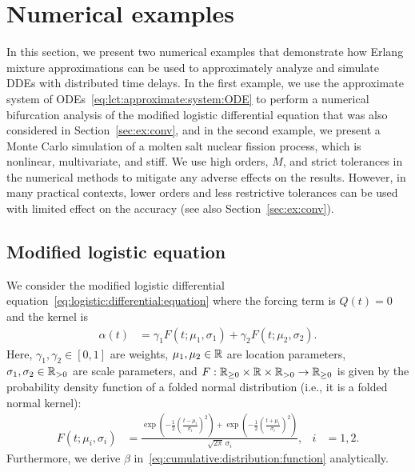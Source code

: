 \section{Numerical examples}\label{sec:ex}
In this section, we present two numerical examples that demonstrate how Erlang mixture approximations can be used to approximately analyze and simulate DDEs with distributed time delays. In the first example, we use the approximate system of ODEs~\eqref{eq:lct:approximate:system:ODE} to perform a numerical bifurcation analysis of the modified logistic differential equation that was also considered in Section~\ref{sec:ex:conv}, and in the second example, we present a Monte Carlo simulation of a molten salt nuclear fission process, which is nonlinear, multivariate, and stiff. We use high orders, $M$, and strict tolerances in the numerical methods to mitigate any adverse effects on the results. However, in many practical contexts, lower orders and less restrictive tolerances can be used with limited effect on the accuracy (see also Section~\ref{sec:ex:conv}).

\subsection{Modified logistic equation}\label{sec:ex:logistic}
We consider the modified logistic differential equation~\eqref{eq:logistic:differential:equation} where the forcing term is $Q(t) = 0$ and the kernel is
%
\begin{align}\label{eq:logistic:equation:kernel}
	\alpha(t) &= \gamma_1 F(t; \mu_1, \sigma_1) + \gamma_2 F(t; \mu_2, \sigma_2).
\end{align}
%
Here, $\gamma_1, \gamma_2 \in [0, 1]$ are weights, $\mu_1, \mu_2 \in \mathbb{R}$ are location parameters, $\sigma_1, \sigma_2 \in \mathbb{R}_{> 0}$ are scale parameters, and $F: \mathbb{R}_{\geq 0} \times \mathbb{R} \times \mathbb{R}_{> 0} \rightarrow \mathbb{R}_{\geq 0}$ is given by the probability density function of a folded normal distribution (i.e., it is a folded normal kernel):
%
\begin{align}\label{eq:folded:normal:pdf}
	F(t; \mu_i, \sigma_i) &= \frac{\exp\left(-\frac{1}{2}\left(\frac{t - \mu_i}{\sigma_i}\right)^2\right) + \exp\left(-\frac{1}{2}\left(\frac{t + \mu_i}{\sigma_i}\right)^2\right)}{\sqrt{2 \pi}\, \sigma_i}, & i &= 1, 2.
\end{align}
%
Furthermore, we derive $\beta$ in~\eqref{eq:cumulative:distribution:function} analytically.

